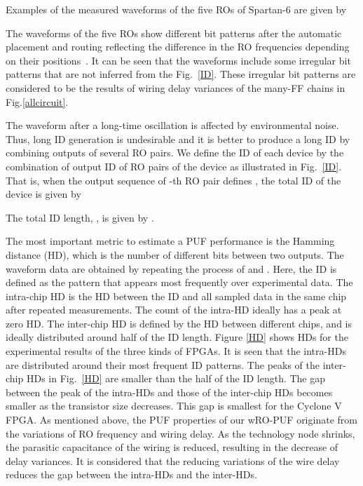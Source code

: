 ﻿\documentclass[aps,preprint,prb,superscriptaddress,amsmath,showpacs,tightenlines]{revtex4}
\begin{document}
Examples of the measured waveforms of the five ROs of Spartan-6 
are given by

The waveforms of the five ROs show different bit patterns 
after the automatic placement and routing
reflecting the difference in  the RO frequencies 
depending on their positions~\cite{Maiti0}.
It can be seen that the waveforms include some irregular bit patterns that are not
inferred from the  Fig.~\ref{ID}. These irregular bit patterns are considered to 
be the results of wiring delay variances of the many-FF chains in Fig.\ref{allcircuit}.


The waveform after a long-time oscillation is 
affected by environmental noise.
Thus, long ID generation is undesirable 
and it is better to produce a long ID by combining outputs of several RO pairs. 
We define the ID of each device by the combination of 
output ID of  RO pairs of the device as illustrated in Fig.~\ref{ID}. 
That is, when the 
output sequence of -th RO pair defines , the total ID of the device 
is given by 

The total ID length, , is given by .


The most important metric to estimate a PUF performance is 
the Hamming distance (HD), which is the number of 
different bits between two outputs.
The waveform data are obtained by repeating the process of  and .
Here, the ID is defined as the pattern that appears most frequently over  experimental data. 
The intra-chip HD is the HD between the ID and all sampled data in the same chip after repeated measurements.
The count of the intra-HD ideally has a peak at zero HD.
The inter-chip HD is defined by the HD between different chips, 
and is ideally distributed around half of the ID length.
Figure \ref{HD} shows  HDs for the experimental results of the 
three kinds of FPGAs. 
It is seen that the intra-HDs are distributed around their most frequent ID patterns.
The peaks of the inter-chip HDs in Fig.~\ref{HD} are smaller than the half of the ID length.
The gap between the peak of the intra-HDs and those of the inter-chip HDs 
becomes smaller as the transistor size decreases.
This gap is smallest for the Cyclone V FPGA.
As mentioned above, the PUF properties of our wRO-PUF originate from 
the variations of RO frequency and wiring delay. 
As the technology node shrinks,  
the parasitic capacitance of the wiring is reduced, 
resulting in the decrease of delay variances.
It is considered that the reducing variations of the wire delay 
reduces the gap between the intra-HDs and the inter-HDs. 
\end{document}
